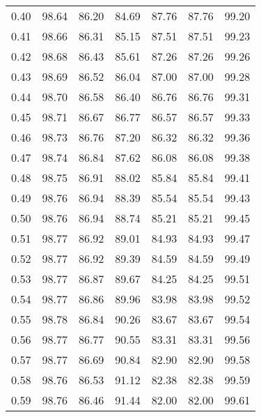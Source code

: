 \begin{tabular}{|c|c|c|c|c|c|c|}
      0.40 &     98.64 &     86.20 &      84.69 &   87.76 &      87.76 &         99.20 \\
      0.41 &     98.66 &     86.31 &      85.15 &   87.51 &      87.51 &         99.23 \\
      0.42 &     98.68 &     86.43 &      85.61 &   87.26 &      87.26 &         99.26 \\
      0.43 &     98.69 &     86.52 &      86.04 &   87.00 &      87.00 &         99.28 \\
      0.44 &     98.70 &     86.58 &      86.40 &   86.76 &      86.76 &         99.31 \\
      0.45 &     98.71 &     86.67 &      86.77 &   86.57 &      86.57 &         99.33 \\
      0.46 &     98.73 &     86.76 &      87.20 &   86.32 &      86.32 &         99.36 \\
      0.47 &     98.74 &     86.84 &      87.62 &   86.08 &      86.08 &         99.38 \\
      0.48 &     98.75 &     86.91 &      88.02 &   85.84 &      85.84 &         99.41 \\
      0.49 &     98.76 &     86.94 &      88.39 &   85.54 &      85.54 &         99.43 \\
      0.50 &     98.76 &     86.94 &      88.74 &   85.21 &      85.21 &         99.45 \\
      0.51 &     98.77 &     86.92 &      89.01 &   84.93 &      84.93 &         99.47 \\
      0.52 &     98.77 &     86.92 &      89.39 &   84.59 &      84.59 &         99.49 \\
      0.53 &     98.77 &     86.87 &      89.67 &   84.25 &      84.25 &         99.51 \\
      0.54 &     98.77 &     86.86 &      89.96 &   83.98 &      83.98 &         99.52 \\
      0.55 &     98.78 &     86.84 &      90.26 &   83.67 &      83.67 &         99.54 \\
      0.56 &     98.77 &     86.77 &      90.55 &   83.31 &      83.31 &         99.56 \\
      0.57 &     98.77 &     86.69 &      90.84 &   82.90 &      82.90 &         99.58 \\
      0.58 &     98.76 &     86.53 &      91.12 &   82.38 &      82.38 &         99.59 \\
      0.59 &     98.76 &     86.46 &      91.44 &   82.00 &      82.00 &         99.61 \\

\end{tabular}
